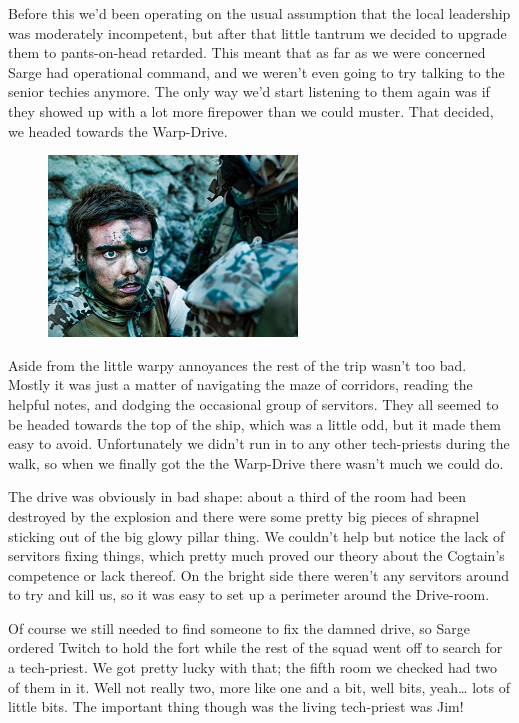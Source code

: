 Before this we’d been operating on the usual assumption that the local leadership was moderately incompetent, but after that little tantrum we decided to upgrade them to pants-on-head retarded. 
This meant that as far as we were concerned Sarge had operational command, and we weren’t even going to try talking to the senior techies anymore. 
The only way we’d start listening to them again was if they showed up with a lot more firepower than we could muster. 
That decided, we headed towards the Warp-Drive.

\begin{figure}
	\begin{center}
		\includegraphics[width=\figwidth]{pics/7/24.png}
	\end{center}
\end{figure}
Aside from the little warpy annoyances the rest of the trip wasn’t too bad. 
Mostly it was just a matter of navigating the maze of corridors, reading the helpful notes, and dodging the occasional group of servitors. 
They all seemed to be headed towards the top of the ship, which was a little odd, but it made them easy to avoid. 
Unfortunately we didn’t run in to any other tech-priests during the walk, so when we finally got the the Warp-Drive there wasn’t much we could do.

The drive was obviously in bad shape: 
about a third of the room had been destroyed by the explosion and there were some pretty big pieces of shrapnel sticking out of the big glowy pillar thing. 
We couldn’t help but notice the lack of servitors fixing things, which pretty much proved our theory about the Cogtain’s competence or lack thereof. 
On the bright side there weren’t any servitors around to try and kill us, so it was easy to set up a perimeter around the Drive-room.

Of course we still needed to find someone to fix the damned drive, so Sarge ordered Twitch to hold the fort while the rest of the squad went off to search for a tech-priest. 
We got pretty lucky with that; 
the fifth room we checked had two of them in it. 
Well not really two, more like one and a bit, well bits, yeah… lots of little bits. 
The important thing though was the living tech-priest was Jim!

